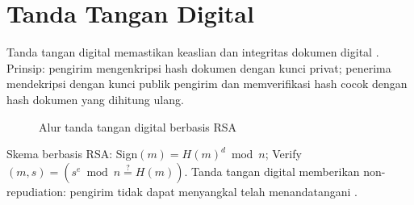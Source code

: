 \section{Tanda Tangan Digital}

Tanda tangan digital memastikan keaslian dan integritas dokumen digital \cite{rivest1978,katz2020,ferguson2010}. Prinsip: pengirim mengenkripsi hash dokumen dengan kunci privat; penerima mendekripsi dengan kunci publik pengirim dan memverifikasi hash cocok dengan hash dokumen yang dihitung ulang.

\begin{figure}[!htbp]
\centering
{}
\caption{Alur tanda tangan digital berbasis RSA}
\label{fig:tanda-tangan}
\end{figure}

Skema berbasis RSA: Sign$(m) = H(m)^d \bmod n$; Verify$(m, s) = (s^e \bmod n \stackrel{?}{=} H(m))$. Tanda tangan digital memberikan non-repudiation: pengirim tidak dapat menyangkal telah menandatangani \cite{rivest1978,katz2020,ferguson2010}.
